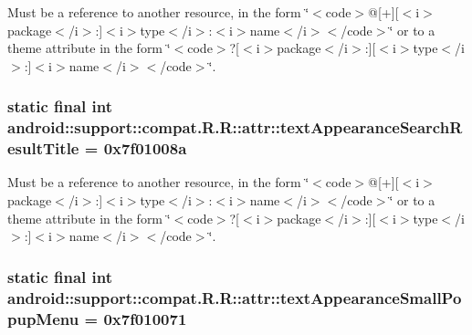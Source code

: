 Must be a reference to another resource, in the form \char`\"{}$<$code$>$@\mbox{[}+\mbox{]}\mbox{[}$<$i$>$package$<$/i$>$:\mbox{]}$<$i$>$type$<$/i$>$:$<$i$>$name$<$/i$>$$<$/code$>$\char`\"{} or to a theme attribute in the form \char`\"{}$<$code$>$?\mbox{[}$<$i$>$package$<$/i$>$:\mbox{]}\mbox{[}$<$i$>$type$<$/i$>$:\mbox{]}$<$i$>$name$<$/i$>$$<$/code$>$\char`\"{}. \hypertarget{classandroid_1_1support_1_1compat_1_1_r_1_1attr_6f21484d1d8f6bd01bc63c37422f600c}{
\subsubsection[{textAppearanceSearchResultTitle}]{\setlength{\rightskip}{0pt plus 5cm}static final int android::support::compat.R.R::attr::textAppearanceSearchResultTitle = 0x7f01008a}}
\label{classandroid_1_1support_1_1compat_1_1_r_1_1attr_6f21484d1d8f6bd01bc63c37422f600c}


Must be a reference to another resource, in the form \char`\"{}$<$code$>$@\mbox{[}+\mbox{]}\mbox{[}$<$i$>$package$<$/i$>$:\mbox{]}$<$i$>$type$<$/i$>$:$<$i$>$name$<$/i$>$$<$/code$>$\char`\"{} or to a theme attribute in the form \char`\"{}$<$code$>$?\mbox{[}$<$i$>$package$<$/i$>$:\mbox{]}\mbox{[}$<$i$>$type$<$/i$>$:\mbox{]}$<$i$>$name$<$/i$>$$<$/code$>$\char`\"{}. \hypertarget{classandroid_1_1support_1_1compat_1_1_r_1_1attr_349468fabe8d7eab0949e315edfc57be}{
\subsubsection[{textAppearanceSmallPopupMenu}]{\setlength{\rightskip}{0pt plus 5cm}static final int android::support::compat.R.R::attr::textAppearanceSmallPopupMenu = 0x7f010071}}
\label{classandroid_1_1support_1_1compat_1_1_r_1_1attr_349468fabe8d7eab0949e315edfc57be}


